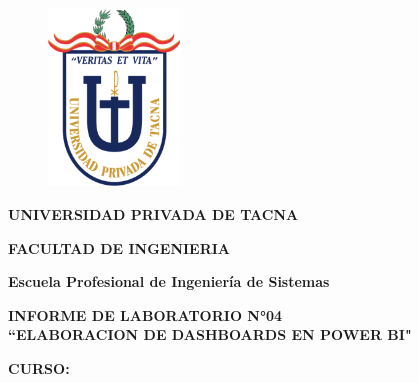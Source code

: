 \documentclass[12pt,letterpaper]{article}
\begin{document}
    \begin{titlepage}
        \begin{center}
            \begin{figure}[htb]
                \begin{center}
                    \includegraphics[width=3.5cm]{./img/logo}
                \end{center}
            \end{figure}
            \vspace*{0.15in}
            \begin{Large}
                \textbf{UNIVERSIDAD PRIVADA DE TACNA}\\
            \end{Large}
            \vspace*{0.15in}
            \begin{Large}
                \textbf{FACULTAD DE INGENIERIA} \\
            \end{Large}
            \vspace*{0.1in}
            \begin{Large}
                \textbf{Escuela Profesional de Ingeniería de Sistemas} \\
            \end{Large}
            \vspace*{0.3in}
            \begin{Large}
                \textbf{INFORME DE LABORATORIO N°04}\\
                \textbf{``ELABORACION DE DASHBOARDS EN POWER BI"}\\
            \end{Large}
            \vspace*{0.2in}
            \begin{Large}
                \textbf{CURSO:} \\
            \end{Large}
            \vspace*{0.1in}
            \begin{large}

\end{large}
\end{center}
\end{titlepage}
\end{document}
